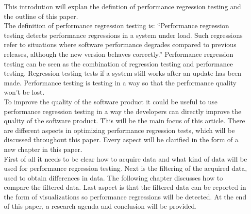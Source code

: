 This introdution will explan the defintion of performance regression testing and the outline of this paper. \\


The definition of performance regression testing is: ``Performance regression testing detects performance
regressions in a system under load. Such regressions refer to
situations where software performance degrades compared to
previous releases, although the new version behaves correctly.''\cite{Definition}
Performance regression testing can be seen as the combination of regression testing and performance testing. Regression testing tests if a system still works after an update has been made. Performance testing is testing in a way so that the performance quality won't be lost. \\
To improve the quality of the software product it could be useful to use performance regression testing in a way the developers can
directly improve the quality of the software product. This will be the main focus of this article. There are different aspects in optimizing performance regression tests, which will be discussed throughout this paper. Every aspect will be clarified in the form of a new chapter in this paper. \\ First of all it needs to be clear how to acquire data and what kind of data will be used for performance regression testing. Next is the filtering of the acquired data, used to obtain differences in data. The following chapter discusses how to compare the filtered data. Last aspect is that the filtered data can be reported in the form of visualizations so performance regressions will be detected. At the end of this paper, a research agenda and conclusion will be provided.

